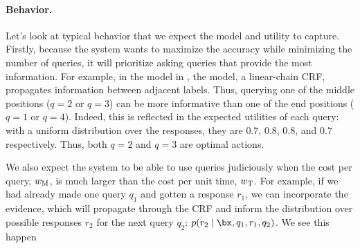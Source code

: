 \paragraph{Behavior.}
Let's look at typical behavior that we expect the model and utility to capture.
Firstly, because the system wants to maximize the accuracy while minimizing the number of queries, it will prioritize asking queries that provide the most information.
For example,
in the model in , the model, a linear-chain CRF, propagates information between adjacent labels. 
Thus, querying one of the middle positions ($q = 2$ or $q = 3$) can be more informative than one of the end positions ($q = 1$ or $q = 4$).
Indeed, this is reflected in the expected utilities of each query: with a uniform distribution over the responses, they are $0.7$, $0.8$, $0.8$, and $0.7$ respectively. Thus, both $q = 2$ and $q = 3$ are optimal actions. 

We also expect the system to be able to use queries judiciously when the cost per query, $w_\text{M}$, is much larger than the cost per unit time, $w_\text{T}$.
For example,
if we had already made one query $q_1$ and gotten a response $r_1$,
we can incorporate the evidence, which will propagate through the CRF
and inform the distribution over possible responses $r_2$ for the next query $q_2$:
$p(r_2 \mid \bx, q_1, r_1, q_2)$.
We see this happen 

